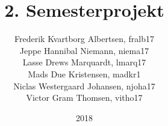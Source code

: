 \documentclass[../main.tex]{subfiles}
\title{2. Semesterprojekt}
\author{
    Frederik Kvartborg Albertsen, fralb17\\
    Jeppe Hannibal Niemann, niema17\\
    Lasse Drews Marquardt, lmarq17\\
    Mads Due Kristensen, madkr1\\
    Niclas Westergaard Johansen, njoha17\\
    Victor Gram Thomsen, vitho17\\
}
\date{2018}
\begin{document}
  \maketitle
  \begin{abstract}
  \end{abstract}
  \newpage
\end{document}
